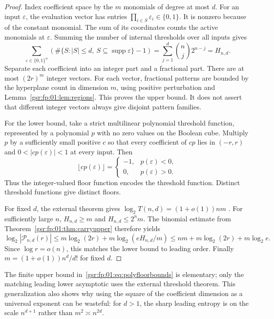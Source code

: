 \documentclass[11pt,letterpaper]{article}
\numberwithin{equation}{section}
\theoremstyle{definition}
\theoremstyle{remark}
\newcommand{\1}{\mathbf 1}
\DeclareMathOperator{\supp}{supp}
\begin{document}
\begin{proof}
Index coefficient space by the $m$ monomials of degree at most $d$.
For an input $\varepsilon$, the evaluation vector has entries
$\prod_{i\in S}\varepsilon_i\in\{0,1\}$. It is nonzero because of the
constant monomial. The sum of its coordinates counts the active
monomials at $\varepsilon$. Summing the number of internal thresholds
over all inputs gives
\[
 \sum_{\varepsilon\in\{0,1\}^n}
  \left(\#\{S:|S|\le d,\ S\subseteq\supp\varepsilon\}-1\right)
 =\sum_{j=1}^d\binom nj2^{n-j}=H_{n,d}.
\]
Separate each coefficient into an integer part and a fractional part.
There are at most $(2r)^m$ integer vectors. For each vector, fractional
patterns are bounded by the hyperplane count in dimension $m$, using
positive perturbation and Lemma~\ref{gsr:fp:01:lem:regions}. This proves the upper
bound. It does not assert that different integer vectors always give
disjoint pattern families.

For the lower bound, take a strict multilinear polynomial threshold
function, represented by a polynomial $p$ with no zero values on the
Boolean cube. Multiply $p$ by a sufficiently small positive $c$ so that
every coefficient of $cp$ lies in $(-r,r)$ and
$0<|cp(\varepsilon)|<1$ at every input. Then
\[
 \lfloor cp(\varepsilon)\rfloor=
 \begin{cases}-1,&p(\varepsilon)<0,\\0,&p(\varepsilon)>0.
 \end{cases}
\]
Thus the integer-valued floor function encodes the threshold function.
Distinct threshold functions give distinct floors.

For fixed $d$, the external theorem gives
$\log_2T(n,d)=(1+o(1))nm$ \cite[Theorem 1.1]{bv}.
For sufficiently large $n$, $H_{n,d}\ge m$ and $H_{n,d}\le2^nm$.
The binomial estimate from Theorem~\ref{gsr:fp:01:thm:carryupper} therefore yields
\[
 \log_2|\mathcal P_{n,d}(r)|
 \le m\log_2(2r)+m\log_2(eH_{n,d}/m)
 \le nm+m\log_2(2r)+m\log_2e.
\]
Since $\log r=o(n)$, this matches the lower bound to leading order.
Finally $m=(1+o(1))n^d/d!$ for fixed $d$.
\end{proof}

The finite upper bound in~\eqref{gsr:fp:01:eq:polyfloorbounds} is elementary;
only the matching leading lower asymptotic uses the external threshold
theorem. This generalization also shows why using the square of the
coefficient dimension as a universal exponent can be wasteful: for
$d>1$, the sharp leading entropy is on the scale $n^{d+1}$ rather than
$m^2\asymp n^{2d}$.
\end{document}
